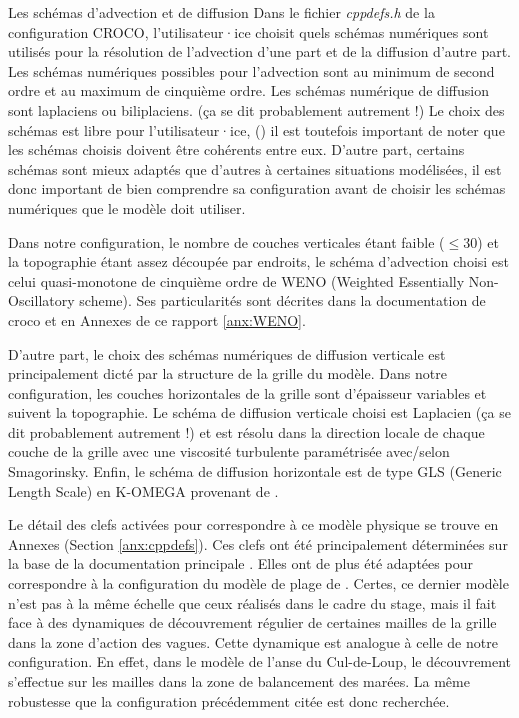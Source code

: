 \documentclass[10pt,a4paper,titlepage]{article}
\begin{document}
\begin{codeEnv}{Les schémas d'advection et de diffusion\label{encadre:precisions_schema}}
    Dans le fichier \textit{cppdefs.h} de la configuration CROCO, l'utilisateur·ice choisit quels schémas numériques sont utilisés pour la résolution de l'advection d'une part et de la diffusion d'autre part.
    Les schémas numériques possibles pour l'advection sont au minimum de second ordre et au maximum de cinquième ordre.
    Les schémas numérique de diffusion sont laplaciens ou biliplaciens. (ça se dit probablement autrement !)
    Le choix des schémas est libre pour l'utilisateur·ice, (\cite{schemas_advection}) il est toutefois important de noter que les schémas choisis doivent être cohérents entre eux.
    D'autre part, certains schémas sont mieux adaptés que d'autres à certaines situations modélisées, il est donc important de bien comprendre sa configuration avant de choisir les schémas numériques que le modèle doit utiliser.
    
    Dans notre configuration, le nombre de couches verticales étant faible ($\leq 30$) et la topographie étant assez découpée par endroits, le schéma d'advection choisi est celui quasi-monotone de cinquième ordre de WENO (Weighted Essentially Non-Oscillatory scheme). 
    Ses particularités sont décrites dans la documentation de croco et en Annexes de ce rapport \ref{anx:WENO}.
    
    D'autre part, le choix des schémas numériques de diffusion verticale est principalement dicté par la structure de la grille du modèle.
    Dans notre configuration, les couches horizontales de la grille sont d'épaisseur variables et suivent la topographie.
    Le schéma de diffusion verticale choisi est Laplacien (ça se dit probablement autrement !) et est résolu dans la direction locale de chaque couche de la grille avec une viscosité turbulente paramétrisée avec/selon Smagorinsky.
    Enfin, le schéma de diffusion horizontale est de type GLS (Generic Length Scale) en K-OMEGA provenant de \cite{GLS_KOMEGA_kolmogorov1941equations}.
\end{codeEnv}

Le détail des clefs activées pour correspondre à ce modèle physique se trouve en Annexes (Section \ref{anx:cppdefs}).
Ces clefs ont été principalement déterminées sur la base de la documentation principale \cite{cppkeys_description}.
Elles ont de plus été adaptées pour correspondre à la configuration du modèle de plage de  \cite[Marchesiello et al. (2021)][ ]{swash_article_MARCHESIELLO2021101816}.
Certes, ce dernier modèle n'est pas à la même échelle que ceux réalisés dans le cadre du stage, mais il fait face à des dynamiques de découvrement régulier de certaines mailles de la grille dans la zone d'action des vagues.
Cette dynamique est analogue à celle de notre configuration.
En effet, dans le modèle de l'anse du Cul-de-Loup, le découvrement s'effectue sur les mailles dans la zone de balancement des marées.
La même robustesse que la configuration précédemment citée est donc recherchée.
\end{document}
